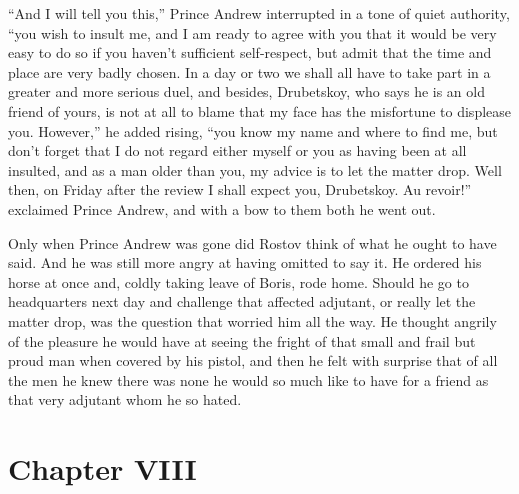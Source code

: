 ``And I will tell you this,'' Prince Andrew interrupted in a tone
of quiet authority, ``you wish to insult me, and I am ready to
agree with you that it would be very easy to do so if you haven't
sufficient self-respect, but admit that the time and place are
very badly chosen. In a day or two we shall all have to take part
in a greater and more serious duel, and besides, Drubetskoy, who
says he is an old friend of yours, is not at all to blame that my
face has the misfortune to displease you. However,'' he added
rising, ``you know my name and where to find me, but don't forget
that I do not regard either myself or you as having been at all
insulted, and as a man older than you, my advice is to let the
matter drop. Well then, on Friday after the review I shall expect
you, Drubetskoy. Au revoir!'' exclaimed Prince Andrew, and with a
bow to them both he went out.

Only when Prince Andrew was gone did Rostov think of what he
ought to have said. And he was still more angry at having omitted
to say it. He ordered his horse at once and, coldly taking leave
of Boris, rode home.  Should he go to headquarters next day and
challenge that affected adjutant, or really let the matter drop,
was the question that worried him all the way. He thought angrily
of the pleasure he would have at seeing the fright of that small
and frail but proud man when covered by his pistol, and then he
felt with surprise that of all the men he knew there was none he
would so much like to have for a friend as that very adjutant
whom he so hated.


\chapter*{Chapter VIII}
\ifaudio     
{} 
\fi

